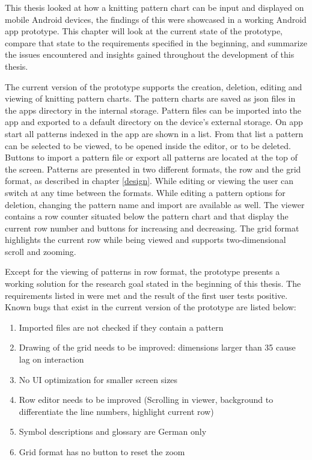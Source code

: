 This thesis looked at how a knitting pattern chart can be input and displayed on mobile Android devices, the findings of this were showcased in a working Android app prototype. This chapter will look at the current state of the prototype, compare that state to the requirements specified in the beginning, and summarize the issues encountered and insights gained throughout the development of this thesis.

The current version of the prototype supports the creation, deletion, editing and viewing of knitting pattern charts. The pattern charts are saved as \gls{json} files in the apps directory in the internal storage. Pattern files can be imported into the app and exported to a default directory on the device's external storage. On app start all patterns indexed in the app are shown in a list. From that list a pattern can be selected to be viewed, to be opened inside the editor, or to be deleted. Buttons to import a pattern file or export all patterns are located at the top of the screen. Patterns are presented in two different formats, the row and the grid format, as described in chapter \ref{design}. While editing or viewing the user can switch at any time between the formats. While editing a pattern options for deletion, changing the pattern name and import are available as well. The viewer contains a row counter situated below the pattern chart and that display the current row number and buttons for increasing and decreasing. The grid format highlights the current row while being viewed and supports two-dimensional scroll and zooming.

Except for the viewing of patterns in row format, the prototype presents a working solution for the research goal stated in the beginning of this thesis. The requirements listed in  were met and the result of the first user tests positive. Known bugs that exist in the current version of the prototype are listed below:

\begin{enumerate}
\item Imported files are not checked if they contain a pattern
\item Drawing of the grid needs to be improved: dimensions larger than 35 cause lag on interaction
\item No \gls{UI} optimization for smaller screen sizes
\item Row editor needs to be improved (Scrolling in viewer, background to differentiate the line numbers, highlight current row)
\item Symbol descriptions and glossary are German only
\item Grid format has no button to reset the zoom
\end{enumerate}

